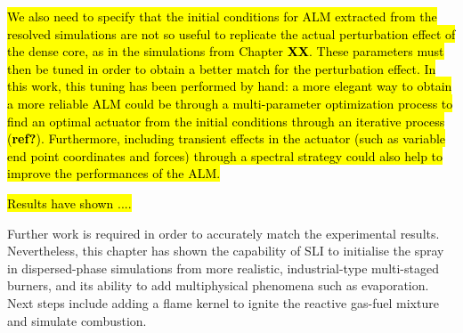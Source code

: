 \hl{We also need to specify that the initial conditions for ALM extracted from the resolved simulations are not so useful to replicate the actual perturbation effect of the dense core, as in the simulations from Chapter \textbf{XX}. These parameters must then be tuned in order to obtain a better match for the perturbation effect. In this work, this tuning has been performed by hand: a more elegant way to obtain a more reliable ALM could be through a multi-parameter optimization process to find an optimal actuator from the initial conditions through an iterative process (\textbf{ref?}). Furthermore, including transient effects in the actuator (such as variable end point coordinates and forces) through a spectral strategy could also help to improve the performances of the ALM.}

\hl{Results have shown ....}

Further work is required in order to accurately match the experimental results. Nevertheless, this chapter has shown the capability of SLI to initialise the spray in dispersed-phase simulations from more realistic, industrial-type multi-staged burners, and its ability to add multiphysical phenomena such as evaporation. Next steps include adding a flame kernel to ignite the reactive gas-fuel mixture and simulate combustion.


